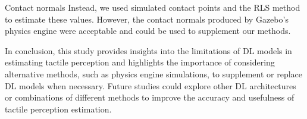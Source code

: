 Contact normals
Instead, we used simulated contact points and the RLS method to estimate these values. However, the contact normals produced by Gazebo's physics engine were acceptable and could be used to supplement our methods.


In conclusion, this study provides insights into the limitations of DL models in estimating tactile perception and highlights the importance of considering alternative methods, such as physics engine simulations, to supplement or replace DL models when necessary. Future studies could explore other DL architectures or combinations of different methods to improve the accuracy and usefulness of tactile perception estimation.